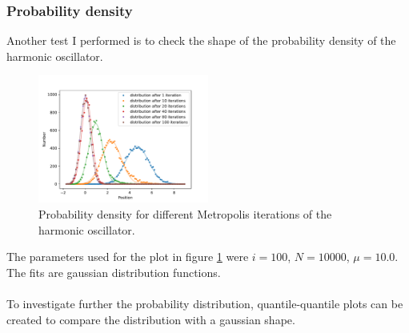 \documentclass{scrartcl}
\begin{document}
	\subsubsection{Probability density}
		Another test I performed is to check the shape of the probability density of the harmonic oscillator.
		\begin{figure}[H]
			\centering
				\includegraphics[width=0.5\textwidth]{../imgs/harmonic_oscillator_track/track_10010000_gauss_1_fit.pdf}
			\caption{Probability density for different Metropolis iterations of the harmonic oscillator.}
			\label{fig:harmonic_oscillator_track_10010000_gauss_1_fit}
		\end{figure}
		The parameters used for the plot in figure \ref{fig:harmonic_oscillator_track_10010000_gauss_1_fit} were $i=100$, $N=10000$, $\mu = 10.0$.
		The fits are gaussian distribution functions.
		\\\\
		To investigate further the probability distribution, quantile-quantile plots can be created to compare the distribution with a gaussian shape.
\end{document}
